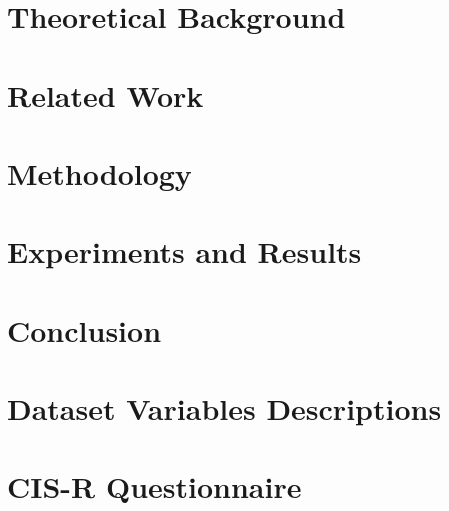 \documentclass[ecp,tc,english]{iiufrgs}
\begin{document}
    \chapter{Theoretical Background}\label{ch:theoretical-background}
    


    \chapter{Related Work} \label{ch:related_work}
    


    \chapter{Methodology}\label{ch:methodology}
    


    \chapter{Experiments and Results}\label{ch:experiments-and-results}
    


    \chapter{Conclusion}\label{ch:conclusions}
    

    

    \annex


    \chapter{Dataset Variables Descriptions}\label{ch:dataset-variiables-description}
    


    \chapter{CIS-R Questionnaire}\label{ch:cis-r}
    
\end{document}
